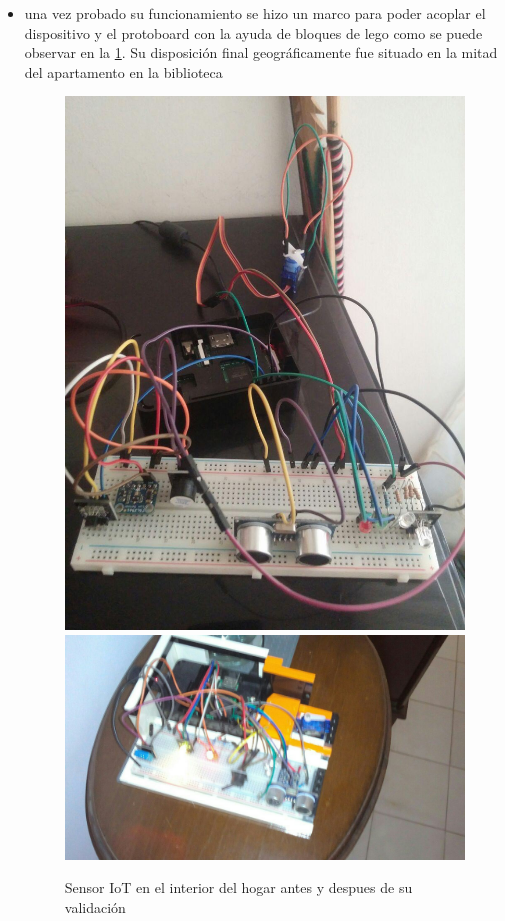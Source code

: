\begin{itemize}
\item una vez probado su funcionamiento se hizo un marco para poder acoplar el dispositivo y el protoboard con la ayuda de bloques de lego como se puede observar en la \ref{fig:rpi3javier_indoor}. Su disposición final geográficamente fue situado en la mitad del apartamento en la biblioteca 
\begin{figure}[!htb]
\centering
\includegraphics[scale=0.165]{./Figuras/rpi3javier_proto.jpg}
\includegraphics[scale=0.22]{./Figuras/rpi3javier_final.jpg}
\caption{Sensor IoT en el interior del hogar antes y despues de su validación}
\label{fig:rpi3javier_indoor}
\vspace*{-10pt}
\end{figure}
\end{itemize} 

